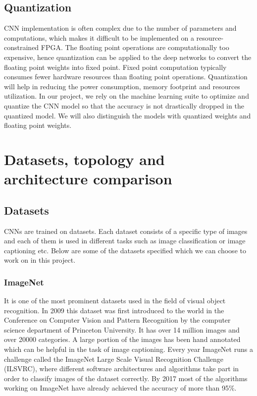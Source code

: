 \documentclass[titlepage]{report}
\begin{document}
\section{Quantization }
CNN implementation is often complex due to the number of parameters and computations, which makes it difficult to be implemented on a resource-constrained FPGA. The floating point operations are computationally too expensive, hence quantization can be applied to the deep networks to convert the floating point weights into fixed point. Fixed point computation typically consumes fewer hardware resources than floating point operations. Quantization will help in reducing the power consumption, memory footprint and resources utilization. In our project, we rely on the machine learning suite to optimize and quantize the CNN model so that the accuracy is not drastically dropped in the quantized model. We will also distinguish the models with quantized weights and floating point weights.


\chapter{Datasets, topology and architecture comparison}

\section{Datasets}
CNNs are trained on datasets. Each dataset consists of a specific type of images and each of them is used in different tasks such as image classification or image captioning etc. Below are some of the datasets specified which we can choose to work on in this project.
\subsection{ImageNet}
It is one of the most prominent datasets used in the field of visual object recognition. In 2009 this dataset was first introduced to the world in the Conference on Computer Vision and Pattern Recognition by the computer science department of  Princeton University. It has over 14 million images and over 20000 categories. A large portion of the images has been hand annotated which can be helpful in the task of image captioning. Every year ImageNet runs a challenge called the ImageNet Large Scale Visual Recognition Challenge (ILSVRC), where different software architectures and algorithms take part in order to classify images of the dataset correctly. By 2017 most of the algorithms working on ImageNet have already achieved the accuracy of more than 95\%.
\end{document}
